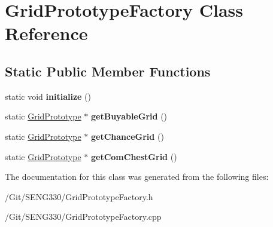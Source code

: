 \hypertarget{class_grid_prototype_factory}{}\section{Grid\+Prototype\+Factory Class Reference}
\label{class_grid_prototype_factory}
\subsection*{Static Public Member Functions}
\begin{DoxyCompactItemize}
\item 
\hypertarget{class_grid_prototype_factory_a127be670d0b9acf13efa7c2bcc6d9ce1}{}static void {\bfseries initialize} ()\label{class_grid_prototype_factory_a127be670d0b9acf13efa7c2bcc6d9ce1}

\item 
\hypertarget{class_grid_prototype_factory_a84e178bbccaf96e2c02e18123b605ad1}{}static \hyperlink{class_grid_prototype}{Grid\+Prototype} $\ast$ {\bfseries get\+Buyable\+Grid} ()\label{class_grid_prototype_factory_a84e178bbccaf96e2c02e18123b605ad1}

\item 
\hypertarget{class_grid_prototype_factory_ae15762b1bb7360965343dafd4193d213}{}static \hyperlink{class_grid_prototype}{Grid\+Prototype} $\ast$ {\bfseries get\+Chance\+Grid} ()\label{class_grid_prototype_factory_ae15762b1bb7360965343dafd4193d213}

\item 
\hypertarget{class_grid_prototype_factory_a7c392f9b56d65f907d2057268231e566}{}static \hyperlink{class_grid_prototype}{Grid\+Prototype} $\ast$ {\bfseries get\+Com\+Chest\+Grid} ()\label{class_grid_prototype_factory_a7c392f9b56d65f907d2057268231e566}

\end{DoxyCompactItemize}


The documentation for this class was generated from the following files\+:\begin{DoxyCompactItemize}
\item 
/\+Git/\+S\+E\+N\+G330/Grid\+Prototype\+Factory.\+h\item 
/\+Git/\+S\+E\+N\+G330/Grid\+Prototype\+Factory.\+cpp\end{DoxyCompactItemize}
